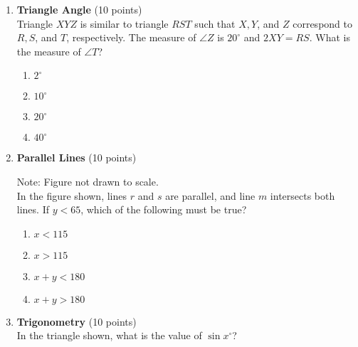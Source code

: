 \begin{enumerate}
  \item \textbf{Triangle Angle} (10 points)\\
  Triangle $X Y Z$ is similar to triangle $R S T$ such that $X, Y$, and $Z$ correspond to $R, S$, and $T$, respectively. The measure of $\angle Z$ is $20^{\circ}$ and $2 X Y=R S$. What is the measure of $\angle T$?\\
  \begin{enumerate}[label=(\Alph*)]
    \item $2^{\circ}$
    \item $10^{\circ}$
    \item $20^{\circ}$
    \item $40^{\circ}$
  \end{enumerate}
  \begin{subanswer}
  \end{subanswer}

  \item \textbf{Parallel Lines} (10 points)\\

  Note: Figure not drawn to scale.\\
  In the figure shown, lines $r$ and $s$ are parallel, and line $m$ intersects both lines. If $y<65$, which of the following must be true?\\
  \begin{enumerate}[label=(\Alph*)]
    \item $x<115$
    \item $x>115$
    \item $x+y<180$
    \item $x+y>180$
  \end{enumerate}
  \begin{subanswer}
  \end{subanswer}
  \newpage

  \item \textbf{Trigonometry} (10 points)\\
  In the triangle shown, what is the value of $\sin x^{\circ}$?
  \begin{subanswer}
  \end{subanswer}


\end{enumerate}
